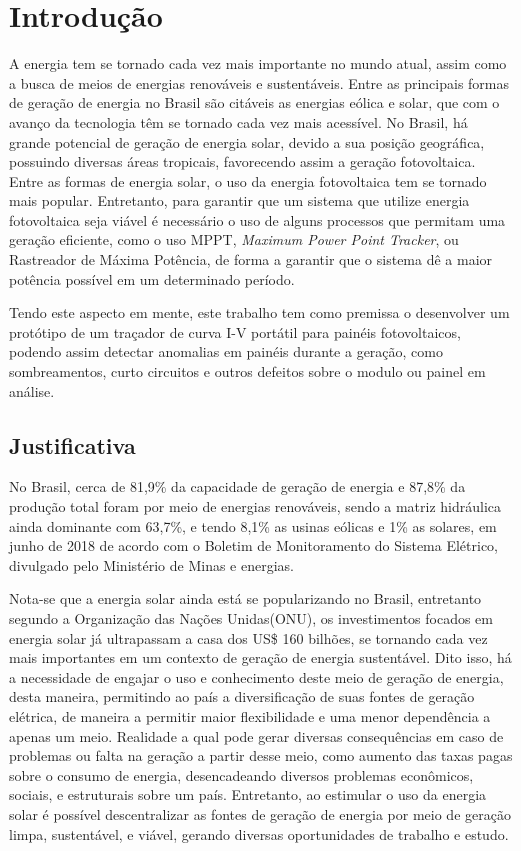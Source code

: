 \chapter{Introdução}
\label{cap:01}
A energia tem se tornado cada vez mais importante no mundo atual, assim como a busca de meios de energias renováveis e sustentáveis. Entre as principais formas de geração de energia no Brasil são citáveis as energias eólica e solar, que com o avanço da tecnologia têm se tornado cada vez mais acessível. No Brasil, há grande potencial de geração de energia solar, devido a sua posição geográfica, possuindo diversas áreas tropicais, favorecendo assim a geração fotovoltaica. Entre as formas de energia solar, o uso da energia fotovoltaica tem se tornado mais popular. Entretanto, para garantir que um sistema que utilize energia fotovoltaica seja viável é necessário o uso de alguns processos que permitam uma geração eficiente, como o uso MPPT, \textit{Maximum Power Point Tracker}, ou Rastreador de Máxima Potência, de forma a garantir que o sistema dê a maior potência possível em um determinado período.

\indent		Tendo este aspecto em mente, este trabalho tem como premissa o desenvolver um protótipo de um traçador de curva I-V portátil para painéis fotovoltaicos, podendo assim detectar anomalias em painéis durante a geração, como sombreamentos, curto circuitos e outros defeitos sobre o modulo ou painel em análise. 


\section{Justificativa}

No Brasil, cerca de 81,9\% da capacidade de geração de energia e 87,8\% da produção total foram por meio de energias renováveis, sendo a matriz hidráulica ainda dominante com 63,7\%, e tendo 8,1\% as usinas eólicas e 1\% as solares, em junho de 2018 de acordo com o Boletim de Monitoramento do Sistema Elétrico, divulgado pelo Ministério de Minas e energias.%

\indent	Nota-se que a energia solar ainda está se popularizando no Brasil, entretanto segundo a Organização das Nações Unidas(ONU), os investimentos focados em energia solar já ultrapassam a casa dos US\$ 160 bilhões, se tornando cada vez mais importantes em um contexto de geração de energia sustentável. Dito isso, há a necessidade de engajar o uso e conhecimento deste meio de geração de energia, desta maneira, permitindo ao país a diversificação de suas fontes de geração elétrica, de maneira a permitir maior flexibilidade e uma menor dependência a apenas um meio.
Realidade a qual pode gerar diversas consequências em caso de problemas ou falta na geração a partir desse meio, como aumento das taxas pagas sobre o consumo de energia, desencadeando diversos problemas econômicos, sociais, e estruturais sobre um país. Entretanto, ao estimular o uso da energia solar é possível descentralizar as fontes de geração de energia por meio de geração limpa, sustentável, e viável, gerando diversas oportunidades de trabalho e estudo.%


